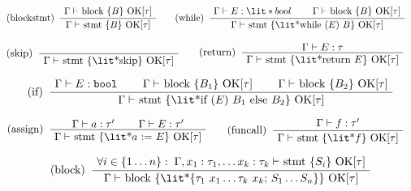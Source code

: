 \documentclass[english,10pt]{article} %
\theoremstyle{definitionstyle}
\theoremstyle{lemmastyle}
\newcommand{\labelspace}{}
\newenvironment{Block}[1]{%
\begin{Warning}[singleextra={\path let \p1=(P), \p2=(O) in ($(\x2,0)+0.5*(0,\y1)$) node[mdframeleftlinetitle] {#1};}]%
}{%
\end{Warning}%
}
\begin{document}
\begin{Block}{Block/stmt OK}

\begin{align*}
\AxiomC{$\Gamma \vdash $ block \{$B$\} OK[$\tau$]}
\LeftLabel{(blockstmt) \labelspace}
\UnaryInfC{$\Gamma \vdash $ stmt \{$B$\} OK[$\tau$]}
\DisplayProof
&\quad\quad
\AxiomC{$\Gamma \vdash E : \lit*{bool}$}
\AxiomC{$\Gamma \vdash $ block \{$B$\} OK[$\tau$]}
\LeftLabel{(while) \labelspace}
\BinaryInfC{$\Gamma \vdash $ stmt \{\lit*{while ($E$) $B$}\} OK[$\tau$]}
\DisplayProof
\end{align*}

\begin{align*}
\AxiomC{\phantom{kelley}}
\LeftLabel{(skip) \labelspace}
\UnaryInfC{$\Gamma \vdash $ stmt \{\lit*{skip}\} OK[$\tau$]}
\DisplayProof
&\quad\quad
\AxiomC{$\Gamma \vdash E : \tau$}
\LeftLabel{(return) \labelspace}
\UnaryInfC{$\Gamma \vdash $ stmt \{\lit*{return $E$}\} OK[$\tau$]}
\DisplayProof
\end{align*}

\begin{align*}
\AxiomC{$\Gamma \vdash E : \texttt{bool}$}
\AxiomC{$\Gamma \vdash $ block \{$B_1$\} OK[$\tau$]}
\AxiomC{$\Gamma \vdash $ block \{$B_2$\} OK[$\tau$]}
\LeftLabel{(if) \labelspace}
\TrinaryInfC{$\Gamma \vdash $ stmt \{\lit*{if ($E$) $B_1$ else $B_2$}\} OK[$\tau$]}
\DisplayProof
\end{align*}

\begin{align*}
\AxiomC{$\Gamma \vdash a : \tau'$}
\AxiomC{$\Gamma \vdash E : \tau'$}
\LeftLabel{(assign) \labelspace}
\BinaryInfC{$\Gamma \vdash $ stmt \{\lit*{$a$ := $E$}\} OK[$\tau$]}
\DisplayProof
&\quad\quad
\AxiomC{$\Gamma \vdash f : \tau'$}
\LeftLabel{(funcall) \labelspace}
\UnaryInfC{$\Gamma \vdash $ stmt \{\lit*{$f$}\} OK[$\tau$]}
\DisplayProof
\end{align*}

\begin{gather*}
\AxiomC{$\forall i\in \{1 \dots n\}:\;\Gamma, x_1 : \tau_1, \dots x_k : \tau_k \vdash$ stmt \{$S_i$\} OK[$\tau$]}
\LeftLabel{(block) \labelspace}
\UnaryInfC{$\Gamma \vdash $ block \{\lit*{\{$\tau_1$ $x_1 \dots \tau_k$ $x_k$; $S_1 \dots S_n$\}}\} OK[$\tau$]}
\DisplayProof
\end{gather*}

\end{Block}
\end{document}
